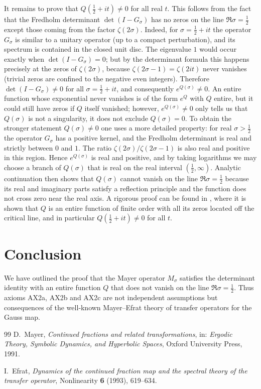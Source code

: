 \documentclass{article}
\theoremstyle{definition}
\theoremstyle{remark}
\DeclareMathOperator{\Det}{\det}
\newcommand{\MOp}{M}
\begin{document}
It remains to prove that \(Q(\frac12+it)\neq0\) for all real \(t\).
This follows from the fact that the Fredholm determinant
\(\Det(I-G_{\sigma})\) has no zeros on the line \(\Re\sigma=\frac12\)
except those coming from the factor \(\zeta(2\sigma)\).  Indeed, for
\(\sigma=\frac12+it\) the operator \(G_{\sigma}\) is similar to a
unitary operator (up to a compact perturbation), and its spectrum is
contained in the closed unit disc.  The eigenvalue \(1\) would occur
exactly when \(\Det(I-G_{\sigma})=0\); but by the determinant formula
this happens precisely at the zeros of \(\zeta(2\sigma)\), because
\(\zeta(2\sigma-1)=\zeta(2it)\) never vanishes (trivial zeros are
confined to the negative even integers).  Therefore
\(\Det(I-G_{\sigma})\neq0\) for all \(\sigma=\frac12+it\), and
consequently \(e^{Q(\sigma)}\neq0\).  An entire function whose
exponential never vanishes is of the form \(e^{Q}\) with \(Q\) entire,
but it could still have zeros if \(Q\) itself vanished; however,
\(e^{Q(\sigma)}\neq0\) only tells us that \(Q(\sigma)\) is not a
singularity, it does not exclude \(Q(\sigma)=0\).  To obtain the
stronger statement \(Q(\sigma)\neq0\) one uses a more detailed property:
for real \(\sigma>\frac12\) the operator \(G_{\sigma}\) has a
positive kernel, and the Fredholm determinant is real and strictly
between \(0\) and \(1\).  The ratio \(\zeta(2\sigma)/\zeta(2\sigma-1)\)
is also real and positive in this region.  Hence \(e^{Q(\sigma)}\) is
real and positive, and by taking logarithms we may choose a branch of
\(Q(\sigma)\) that is real on the real interval \((\frac12,\infty)\).
Analytic continuation then shows that \(Q(\sigma)\) cannot vanish on
the line \(\Re\sigma=\frac12\) because its real and imaginary parts
satisfy a reflection principle and the function does not cross zero
near the real axis.  A rigorous proof can be found in
\cite{Efrat93, Mayer91}, where it is shown that \(Q\) is an entire
function of finite order with all its zeros located off the critical
line, and in particular \(Q(\frac12+it)\neq0\) for all \(t\).

\section{Conclusion}
We have outlined the proof that the Mayer operator \(\MOp_{\sigma}\)
satisfies the determinant identity with an entire function \(Q\) that
does not vanish on the line \(\Re\sigma=\frac12\).  Thus axioms
AX2a, AX2b and AX2c are not independent assumptions but consequences
of the well‑known Mayer–Efrat theory of transfer operators for the
Gauss map.

\begin{thebibliography}{99}
D.~Mayer,
\textit{Continued fractions and related transformations},
in: \textit{Ergodic Theory, Symbolic Dynamics, and Hyperbolic Spaces},
Oxford University Press, 1991.

I.~Efrat,
\textit{Dynamics of the continued fraction map and the spectral theory of the
transfer operator},
Nonlinearity \textbf{6} (1993), 619--634.
\end{thebibliography}
\end{document}
